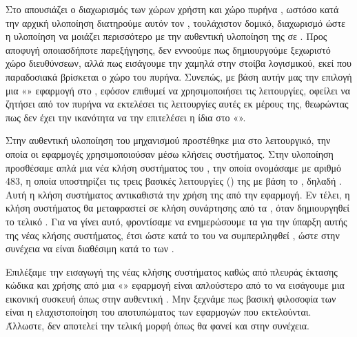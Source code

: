 Στο  απουσιάζει ο διαχωρισμός των
χώρων χρήστη και χώρο πυρήνα ,
ωστόσο κατά την αρχική υλοποίηση διατηρούμε αυτόν τον , τουλάχιστον
δομικό, διαχωρισμό ώστε η υλοποίηση να μοιάζει περισσότερο με την
αυθεντική υλοποίηση της  σε . Προς αποφυγή
οποιασδήποτε παρεξήγησης,
δεν εννοούμε πως
δημιουργούμε ξεχωριστό χώρο διευθύνσεων, αλλά πως εισάγουμε την
 χαμηλά στην στοίβα λογισμικού, εκεί που παραδοσιακά βρίσκεται
ο χώρο του πυρήνα. Συνεπώς, με βάση αυτήν μας την επιλογή μια «»
εφαρμογή στο , εφόσον
επιθυμεί να χρησιμοποιήσει τις  λειτουργίες, οφείλει να ζητήσει
από τον πυρήνα να εκτελέσει τις λειτουργίες αυτές εκ μέρους της,
θεωρώντας πως δεν έχει την ικανότητα να την επιτελέσει η ίδια στο «».
\newline

Στην αυθεντική υλοποίηση του  μηχανισμού προστέθηκε μια 
στο λειτουργικό, την οποία οι εφαρμογές χρησιμοποιούσαν μέσω 
κλήσεις συστήματος. Στην  υλοποίηση προσθέσαμε απλά μια
νέα κλήση συστήματος  του  , την οποία ονομάσαμε
 με αριθμό 483, η οποία υποστηρίζει τις τρεις βασικές λειτουργίες
() της  με βάση το , δηλαδή .
Αυτή η κλήση συστήματος αντικαθιστά την χρήση της  από
την εφαρμογή. Εν τέλει, η κλήση συστήματος θα μεταφραστεί
σε κλήση συνάρτησης από τα , όταν δημιουργηθεί το
τελικό . Για να γίνει αυτό, φροντίσαμε να ενημερώσουμε
τα  για την ύπαρξη αυτής της νέας κλήσης συστήματος, έτσι
ώστε κατά το  του  να συμπεριληφθεί , ώστε στην
συνέχεια να είναι διαθέσιμη κατά το  των .
\newline

Επιλέξαμε την εισαγωγή της νέας κλήσης συστήματος καθώς από πλευράς έκτασης
κώδικα και χρήσης από
μια «» εφαρμογή είναι απλούστερο από το να εισάγουμε
μια εικονική συσκευή όπως στην αυθεντική . Μην ξεχνάμε
πως βασική φιλοσοφία των  είναι η ελαχιστοποίηση
του αποτυπώματος των εφαρμογών που εκτελούνται. Άλλωστε, δεν αποτελεί
την τελική μορφή όπως θα φανεί και στην συνέχεια.
\newline

